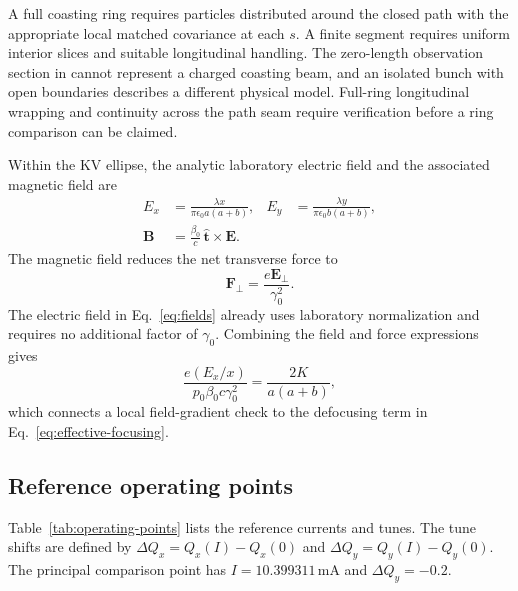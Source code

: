 \documentclass[11pt,a4paper]{article}
\numberwithin{equation}{section}
\newcommand{\units}[1]{\,\mathrm{#1}}
\begin{document}
A full coasting ring requires particles distributed around the closed
path with the appropriate local matched covariance at each $s$. A finite
segment requires uniform interior slices and suitable longitudinal
handling. The zero-length observation section in 
cannot represent a charged coasting beam, and an isolated bunch with open
boundaries describes a different physical model. Full-ring longitudinal
wrapping and continuity across the path seam require verification before
a ring comparison can be claimed.

Within the KV ellipse, the analytic laboratory electric field and the
associated magnetic field are
\begin{equation}
  \begin{aligned}
    E_x&=\frac{\lambda x}{\pi\epsilon_0a(a+b)},&
    E_y&=\frac{\lambda y}{\pi\epsilon_0b(a+b)},\\
    \mathbf B&=\frac{\beta_0}{c}\,\hat{\mathbf t}\times\mathbf E.
  \end{aligned}
  \label{eq:fields}
\end{equation}
The magnetic field reduces the net transverse force to
\begin{equation}
  \mathbf F_\perp=\frac{e\mathbf E_\perp}{\gamma_0^2}.
  \label{eq:force}
\end{equation}
The electric field in Eq.~\eqref{eq:fields} already uses laboratory
normalization and requires no additional factor of $\gamma_0$. Combining
the field and force expressions gives
\begin{equation}
  \frac{e(E_x/x)}{p_0\beta_0c\gamma_0^2}
     =\frac{2K}{a(a+b)},
  \label{eq:force-gradient}
\end{equation}
which connects a local field-gradient check to the defocusing term in
Eq.~\eqref{eq:effective-focusing}.

\subsection{Reference operating points}

Table~\ref{tab:operating-points} lists the reference currents and tunes.
The tune shifts are defined by $\Delta Q_x=Q_x(I)-Q_x(0)$ and
$\Delta Q_y=Q_y(I)-Q_y(0)$. The principal comparison point has
$I=10.399311\units{mA}$ and $\Delta Q_y=-0.2$.
\end{document}

